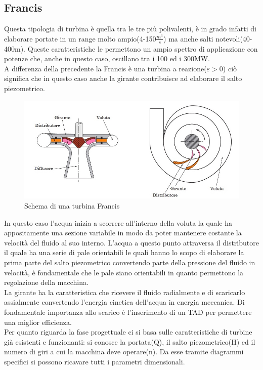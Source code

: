 \subsection{Francis}
Questa tipologia di turbina è quella tra le tre più polivalenti, è in grado infatti di elaborare portate in un range molto ampio(4-150{\large$\frac{m^3}{s}$}) ma anche salti notevoli(40-400m). Queste caratteristiche le permettono un ampio spettro di applicazione con potenze che, anche in questo caso, oscillano tra i 100 ed i 300MW.\\
A differenza della precedente la Francis è una turbina a reazione($\varepsilon>0$) ciò significa che in questo caso anche la girante contribuisce ad elaborare il salto piezometrico.
\begin{figure}[H]
    \centering
    \includegraphics[height=0.4\textwidth]{res/cap 3/francis}
    \caption{Schema di una turbina Francis}
\end{figure}\noindent
In questo caso l'acqua inizia a scorrere all'interno della voluta la quale ha appositamente una sezione variabile in modo da poter mantenere costante la velocità del fluido al suo interno.
L'acqua a questo punto attraversa il distributore il quale ha una serie di pale orientabili le quali hanno lo scopo di elaborare la prima parte del salto piezometrico convertendo parte della pressione del fluido in velocità, è fondamentale che le pale siano orientabili in quanto permettono la regolazione della macchina.\\
La girante ha la caratteristica che ricevere il fluido radialmente e di scaricarlo assialmente convertendo l'energia cinetica dell'acqua in energia meccanica.
Di fondamentale importanza allo scarico è l'inserimento di un TAD per permettere una miglior efficienza.\\
Per quanto riguarda la fase progettuale ci si basa sulle caratteristiche di turbine già esistenti e funzionanti: si conosce la portata(Q), il salto piezometrico(H) ed il numero di giri a cui la macchina deve operare(n). Da esse tramite diagrammi specifici si possono ricavare tutti i parametri dimensionali.
\vfill
\newpage
